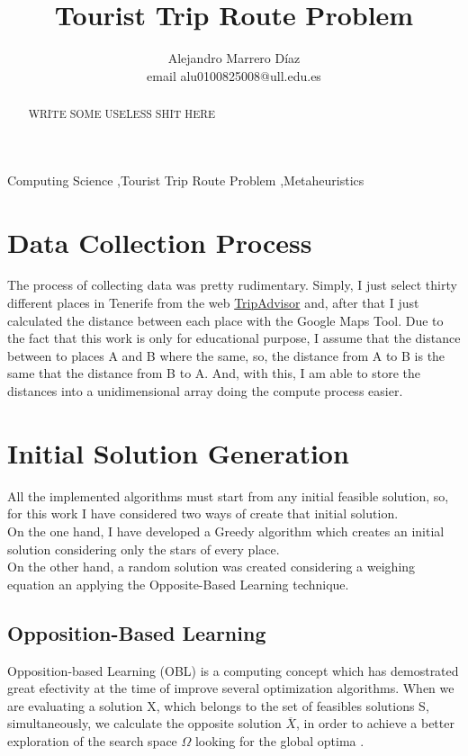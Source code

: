 \documentclass[preprint,14pt]{elsarticle}
\begin{document}
\begin{frontmatter}


\title{\textbf{Tourist Trip Route Problem}}
\author{Alejandro Marrero Díaz \\ email {alu0100825008@ull.edu.es}}
\address{La Laguna, Tenerife, ES}

\begin{abstract}
WRITE SOME USELESS SHIT HERE
\end{abstract}
\begin{keyword}
Computing Science \sep Tourist Trip Route Problem \sep Metaheuristics
\end{keyword}
\end{frontmatter}


\section{Data Collection Process}
\label{S:data}
The process of collecting data was pretty rudimentary. Simply, I just select thirty different places in Tenerife from the web \href{https://www.tripadvisor.es/Attractions-g187479-Activities-Tenerife_Canary_Islands.html}{TripAdvisor} and, after that I just calculated the distance between each place with the Google Maps Tool. Due to the fact that this work is only for educational purpose, I assume that the distance between to places A and B where the same, so, the distance from A to B is the same that the distance from B to A. And, with this, I am able to store the distances into a unidimensional array doing the compute process easier.

\section{Initial Solution Generation}
All the implemented algorithms must start from any initial feasible solution, so, for this work I have considered two ways of create that initial solution. \\
On the one hand, I have developed a Greedy algorithm which creates an initial solution considering only the stars of every place. \\
On the other hand, a random solution was created considering a weighing equation \label{eq:w} an applying the Opposite-Based Learning technique.
\label{S:random}
\subsection{Opposition-Based Learning}
\label{ss:OBL}
Opposition-based Learning (OBL) \cite{obl, obl2, OPSO, OPSO2} is a computing concept which has demostrated great efectivity at the time of improve several optimization algorithms. When we are evaluating a solution X, which belongs to the set of feasibles solutions S, simultaneously, we calculate the opposite solution $\overline{X}$, in order to achieve a better exploration of the search space $\Omega$ looking for the global optima  \cite{obl}.
\end{document}

